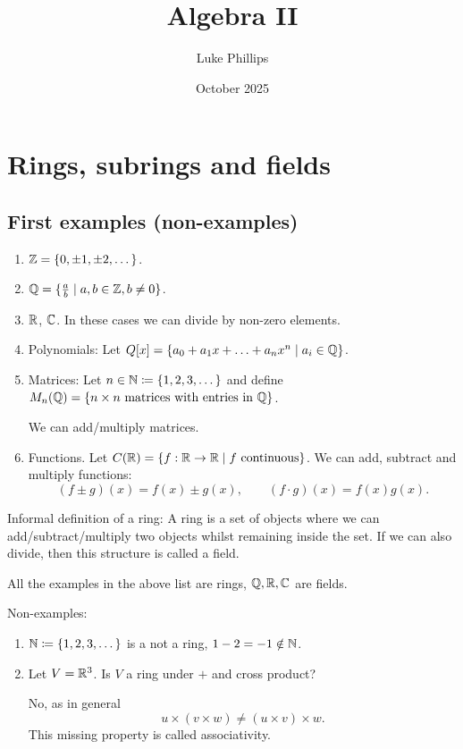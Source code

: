 \documentclass[10pt, a4paper]{article}
\title{Algebra II}
\author{Luke Phillips}
\date{October 2025}
\begin{document}
\maketitle

\newpage

\tableofcontents

\newpage

\section{Rings,
subrings and fields}

\subsection{First examples
(non-examples)}

\begin{enumerate}[label = (\roman*)]
    \item $\mathbb{Z} = \{0, \pm 1, \pm 2, \dotsc\}$.

    \item $\mathbb{Q} = \{\frac{a}{b} \mid a, b \in \mathbb{Z}, b \neq 0\}$.

    \item $\mathbb{R}$,
    $\mathbb{C}$.
    In these cases we can divide by non-zero elements.

    \item Polynomials:
    Let $Q[x] = \{a_0 + a_1x + \dotsc + a_nx ^ n \mid a_i \in \mathbb{Q}\}$.

    \item Matrices:
    Let $n \in \mathbb{N} \coloneqq \{1, 2, 3, \dotsc\}$ and define $M_n(\mathbb{Q}) = \{n \times n\text{ matrices with entries in } \mathbb{Q}\}$.

    We can add/multiply matrices.

    \item Functions.
    Let $C(\mathbb{R}) = \{f : \mathbb{R} \to \mathbb{R} \mid f\text{ continuous}\}$.
    We can add,
    subtract and multiply functions:
    \[
    (f \pm g)(x) = f(x) \pm g(x),\qquad (f\cdot g)(x) = f(x)g(x).
    \]
\end{enumerate}

Informal definition of a ring:
A ring is a set of objects where we can add/subtract/multiply two objects whilst remaining inside the set.
If we can also divide,
then this structure is called a field.

All the examples in the above list are rings,
$\mathbb{Q}, \mathbb{R}, \mathbb{C}$ are fields.

Non-examples:
\begin{enumerate}[label = (\roman*)]
    \item $\mathbb{N} \coloneqq \{1, 2, 3, \dotsc\}$ is a not a ring,
    $1 - 2 = -1 \notin \mathbb{N}$.

    \item Let $V = \mathbb{R} ^ 3$.
    Is $V$ a ring under $+$ and cross product?

    No,
    as in general
    \[
    u \times (v \times w) \neq (u \times v) \times w.
    \]
    This missing property is called associativity.
\end{enumerate}
\end{document}
